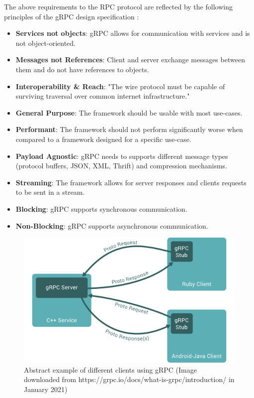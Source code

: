 \documentclass[conference]{IEEEtran}
\begin{document}
The above requirements to the RPC protocol are reflected by the following principles of the gRPC design specification \cite{grpcmotiviation}:

\begin{itemize}
	\item \textbf{Services not objects}: gRPC allows for communication with services and is not object-oriented.
	\item \textbf{Messages not References}: Client and server exchange messages between them and do not have references to objects.
	\item \textbf{Interoperability \& Reach}: "The wire protocol must be capable of surviving traversal over common internet infrastructure." \cite{grpcmotiviation}
	\item \textbf{General Purpose}: The framework should be usable with most use-cases.
	\item \textbf{Performant}: The framework should not perform significantly worse when compared to a framework designed for a specific use-case.
	\item \textbf{Payload Agnostic}: gRPC needs to supports different message types (protocol buffers, JSON, XML, Thrift) and compression mechanisms.
	\item \textbf{Streaming}: The framework allows for server responses and clients requests to be sent in a stream.
	\item \textbf{Blocking}: gRPC supports synchronous communication.
	\item \textbf{Non-Blocking}: gRPC supports asynchronous communication.
\end{itemize}

\begin{figure}
	\centering
	\includegraphics[width=0.8\linewidth]{grpc1.png}
	\caption{Abstract example of different clients using gRPC (Image downloaded from https://grpc.io/docs/what-is-grpc/introduction/ in January 2021)}
	\label{fig:grpcuse}
\end{figure}
\end{document}
